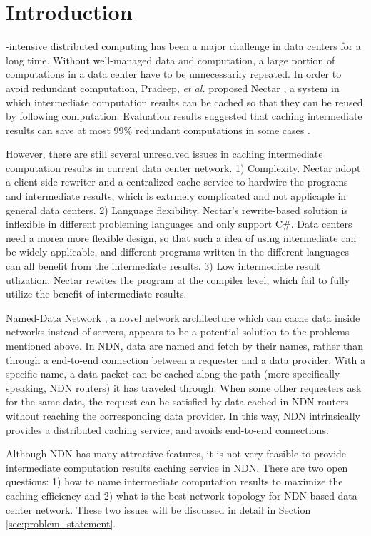 \section{Introduction}
-intensive distributed computing has been a major challenge
in data centers for a long time.  Without well-managed data and computation, a
large portion of computations in a data center have to be unnecessarily
repeated.  In order to avoid redundant computation, Pradeep, {\it et al.}
proposed Nectar \cite{gunda2010nectar}, a system in which intermediate computation
results can be cached so that they can be reused by following computation.
Evaluation results suggested that caching intermediate results can save at most
99\% redundant computations in some cases \cite{gunda2010nectar}.

However, there are still several unresolved issues in caching intermediate
computation results in current data center network.  1) Complexity. Nectar adopt a client-side rewriter and a centralized cache service to hardwire the programs and intermediate results, which is extrmely complicated and not applicaple in general data centers. 2) Language flexibility. Nectar's rewrite-based solution is inflexible in different probleming languages and only support C#. 
Data centers need a morea more flexible design, so that such a idea of using intermediate can be widely applicable, and different programs written in the different
languages can all benefit from the intermediate results. 3) Low intermediate result utlization. Nectar rewites the program at the compiler level, which fail to fully utilize the benefit of intermediate results.

Named-Data Network \cite{jacobson2009networking}, a novel network architecture
which can cache data inside networks instead of servers, appears to be a
potential solution to the problems mentioned above.  In NDN, data are named and
fetch by their names, rather than through a end-to-end connection between a
requester and a data provider.  With a specific name, a data packet can be
cached along the path (more specifically speaking, NDN routers) it has traveled
through.  When some other requesters ask for the same data, the request can be
satisfied by data cached in NDN routers without reaching the corresponding data
provider.  In this way, NDN intrinsically provides a distributed caching
service, and avoids end-to-end connections. 

Although NDN has many attractive features, it is not very feasible to provide
intermediate computation results caching service in NDN.  There are two open
questions: 1) how to name intermediate computation results to maximize the
caching efficiency and 2) what is the best network topology for NDN-based data
center network.  These two issues will be discussed in detail in Section
\ref{sec:problem_statement}.

